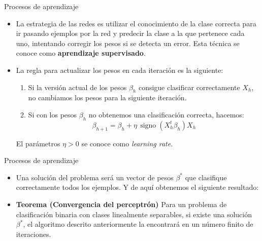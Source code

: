 \documentclass[spanish]{beamer}
\begin{document}
\begin{frame}{Procesos de aprendizaje}
\begin{itemize}
\item La estrategia de las redes es utilizar el conocimiento de la clase correcta para ir pasando ejemplos por la red y predecir la clase a la que pertenece cada uno, intentando corregir los pesos si se detecta un error. Esta técnica se conoce como \textbf{aprendizaje supervisado}.
\item La regla para actualizar los pesos en cada iteración es la siguiente:
  \begin{enumerate}
    \item Si la versión actual de los pesos $\beta_h$ consigue clasificar correctamente $X_h$, no cambiamos los pesos para la siguiente iteración.
    \item Si con los pesos $\beta_h$ no obtenemos una clasificación correcta, hacemos:
    $$\beta_{h+1} = \beta_h + \eta \, \operatorname{signo}(X^{t}_{h} \beta_h)X_h  $$
  \end{enumerate}
  El parámetros $\eta > 0$ se conoce como \textit{learning rate}.
\end{itemize}
\end{frame}

\begin{frame}{Procesos de aprendizaje}
  \begin{itemize}
    \item Una solución del problema será un vector de pesos $\beta^\ast$ que clasifique correctamente todos los ejemplos. Y de aquí obtenemos el siguiente resultado:
    \item \textbf{Teorema (Convergencia del perceptrón)} Para un problema de clasificación binaria con clases linealmente separables, si existe una solución $\beta^\ast$, el algoritmo descrito anteriormente la encontrará en un número finito de iteraciones.
  \end{itemize}
\end{frame}
\end{document}

